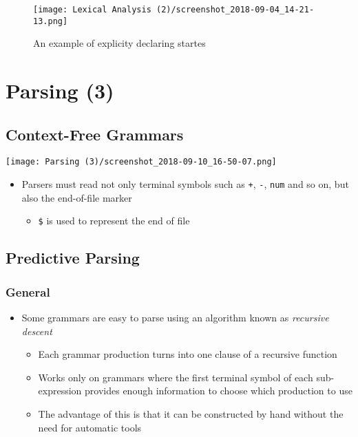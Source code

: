 \documentclass[11pt]{article}
\begin{document}
\begin{figure}[htbp]
\centering
\texttt{[image: Lexical Analysis (2)/screenshot\_2018-09-04\_14-21-13.png]}
\caption{\label{fig:org191c8da}
An example of explicity declaring startes}
\end{figure}

\section{Parsing (3)}
\label{sec:org766c1e8}
\subsection{Context-Free Grammars}
\label{sec:org5f16f00}
\begin{center}
\texttt{[image: Parsing (3)/screenshot\_2018-09-10\_16-50-07.png]}
\label{orgb873eb7}
\end{center}

\begin{itemize}
\item Parsers must read not only terminal symbols such as \texttt{+}, \texttt{-}, \texttt{num} and so on, but also the end-of-file marker
\begin{itemize}
\item \texttt{\$} is used to represent the end of file
\end{itemize}
\end{itemize}

\subsection{Predictive Parsing}
\label{sec:org38d69ed}
\subsubsection{General}
\label{sec:orgb0e942e}
\begin{itemize}
\item Some grammars are easy to parse using an algorithm known as \emph{recursive descent}
\begin{itemize}
\item Each grammar production turns into one clause of a recursive function
\item Works only on grammars where the first terminal symbol of each sub-expression provides enough information to choose which production to use
\item The advantage of this is that it can be constructed by hand without the need for automatic tools
\end{itemize}
\end{itemize}
\end{document}
